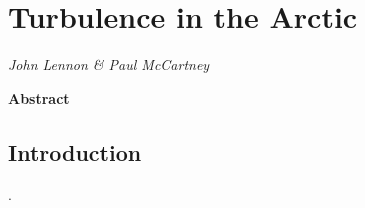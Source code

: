 \documentclass[11pt,bibliography=totoc,openany,numbers=noendperiod]{scrbook}
\begin{document}
\mainmatter



\chapter{Turbulence in the Arctic}          %
\label{john:turbulence}

\begin{center}								%

\textit{John Lennon \& Paul McCartney}				%

\vspace{1cm}

\begin{minipage}{0.9\textwidth}				%
\centerline{\textbf{\large Abstract}}
\vspace{0.3cm}

\lipsum[1]									%

\end{minipage}
\end{center}

\vspace{1cm}
\section{Introduction}		%
\label{john:introduction}
\lipsum[1] \citep{nilsen2016simple}.		%
\end{document}
